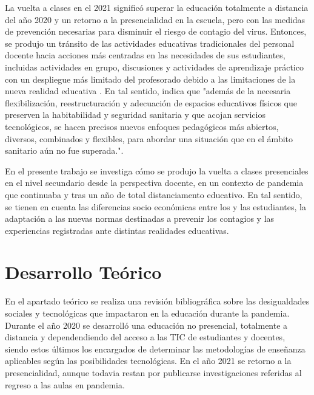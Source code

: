\documentclass[spanish]{textolivre}
\begin{document}
La vuelta a clases en el 2021 significó superar la educación totalmente a distancia del año 2020 y un retorno a la presencialidad en la escuela, pero con las medidas de prevención necesarias para disminuir el riesgo de contagio del virus. Entonces, se produjo un tránsito de las actividades educativas tradicionales del personal docente hacia acciones más centradas en las necesidades de sus estudiantes, incluidas actividades en grupo, discusiones y actividades de aprendizaje práctico con un despliegue más limitado del profesorado debido a las limitaciones de la nueva realidad educativa \cite{zhu_education_2020}. En tal sentido, \textcite[p. 18]{garcia_aretio_covid-19_2021} indica que "además de la necesaria flexibilización, reestructuración y adecuación de espacios educativos físicos que preserven la habitabilidad y seguridad sanitaria y que acojan servicios tecnológicos, se hacen precisos nuevos enfoques pedagógicos más abiertos, diversos, combinados y flexibles, para abordar una situación que en el ámbito sanitario aún no fue superada.".

En el presente trabajo se investiga cómo se produjo la vuelta a clases presenciales en el nivel secundario desde la perspectiva docente, en un contexto de pandemia que continuaba y tras un año de total distanciamento educativo. En tal sentido, se tienen en cuenta las diferencias socio económicas entre los y las estudiantes, la adaptación a las nuevas normas destinadas a prevenir los contagios y las experiencias registradas ante distintas realidades educativas.

\section{Desarrollo Teórico}\label{sec-normas}
En el apartado teórico se realiza una revisión bibliográfica sobre las desigualdades sociales y tecnológicas que impactaron en la educación durante la pandemia. Durante el año 2020 se desarrolló una educación no presencial, totalmente a distancia y dependendiendo del acceso a las TIC de estudiantes y docentes, siendo estos últimos los encargados de determinar las metodologías de enseñanza aplicables según las posibilidades tecnológicas. En el año 2021 se retorno a la presencialidad, aunque todavia restan por publicarse investigaciones referidas al regreso a las aulas en pandemia.
\end{document}
